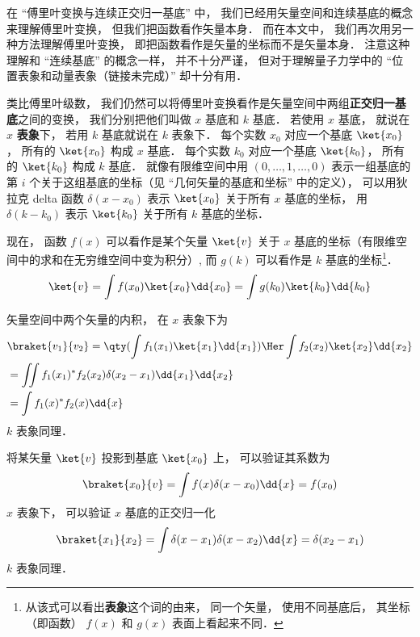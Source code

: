 
\begin{issues}
\issueTODO
\end{issues}


在 “傅里叶变换与连续正交归一基底” 中， 我们已经用矢量空间和连续基底的概念来理解傅里叶变换， 但我们把函数看作矢量本身． 而在本文中， 我们再次用另一种方法理解傅里叶变换， 即把函数看作是矢量的坐标而不是矢量本身． 注意这种理解和 “连续基底” 的概念一样， 并不十分严谨， 但对于理解量子力学中的 “位置表象和动量表象（链接未完成）” 却十分有用．

类比傅里叶级数， 我们仍然可以将傅里叶变换看作是矢量空间中两组\textbf{正交归一基底}之间的变换， 我们分别把他们叫做 $x$ 基底和 $k$ 基底． 若使用 $x$ 基底， 就说在 $x$ \textbf{表象}下， 若用 $k$ 基底就说在 $k$ 表象下． 每个实数 $x_0$ 对应一个基底 $\ket {x_0}$， 所有的 $\ket{x_0}$ 构成 $x$ 基底． 每个实数 $k_0$ 对应一个基底 $\ket {k_0}$， 所有的 $\ket {k_0}$ 构成 $k$ 基底． 就像有限维空间中用 $(0, \dots , 1, \dots , 0)$ 表示一组基底的第 $i$ 个关于这组基底的坐标（见 “几何矢量的基底和坐标” 中的定义）， 可以用狄拉克 delta 函数 $\delta (x - x_0)$ 表示 $\ket {x_0}$ 关于所有 $x$ 基底的坐标， 用 $\delta (k - k_0)$ 表示 $\ket {k_0}$ 关于所有 $k$ 基底的坐标．

现在， 函数 $f(x)$ 可以看作是某个矢量 $\ket{v}$ 关于 $x$ 基底的坐标（有限维空间中的求和在无穷维空间中变为积分）, 而 $g(k)$ 可以看作是 $k$ 基底的坐标\footnote{从该式可以看出\textbf{表象}这个词的由来， 同一个矢量， 使用不同基底后， 其坐标（即函数） $f(x)$ 和 $g(x)$ 表面上看起来不同．}．
\begin{equation}
\ket{v} = \int f(x_0) \ket {x_0} \dd{x_0} = \int g(k_0) \ket {k_0} \dd{k_0}
\end{equation}

矢量空间中两个矢量的内积， 在 $x$ 表象下为
\begin{equation}
\begin{aligned}
&\braket{v_1}{v_2} = \qty(\int f_1(x_1) \ket{x_1} \dd{x_1})\Her  \int f_2(x_2) \ket{x_2} \dd{x_2}\\
&=\iint f_1(x_1)^* f_2(x_2) \delta (x_2 - x_1) \dd{x_1}\dd{x_2}\\
&=\int f_1(x)^* f_2(x) \dd{x}
\end{aligned}
\end{equation}
$k$ 表象同理．

将某矢量 $\ket{v}$ 投影到基底 $\ket{x_0}$ 上， 可以验证其系数为
\begin{equation}
\braket{x_0}{v} = \int f(x) \delta (x - x_0) \dd{x} = f(x_0)
\end{equation}
$x$ 表象下， 可以验证 $x$ 基底的正交归一化%
\begin{equation}
\braket{x_1}{x_2} = \int \delta (x - x_1) \delta (x - x_2) \dd{x} = \delta (x_2 - x_1)
\end{equation}
$k$ 表象同理．

